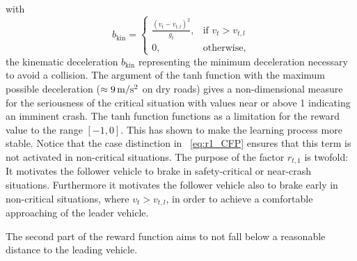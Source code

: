 \documentclass[review]{elsarticle}
\providecommand{\martinc}[1]{}                  %
\providecommand{\sub}[1]{_{\mathrm{#1}}}  %
\providecommand{\3}{{\ss}}
\begin{document}
	with
	\begin{equation}
	\label{bkin}
	b\sub{kin} = 
	\begin{cases}
	\frac{(v_t-v_{t,l})^2}{g_t},& \text{if } v_t>v_{t,l}\\
	0,              & \text{otherwise},
	\end{cases}
	\end{equation}
	the kinematic deceleration $b\sub{kin}$ representing the minimum deceleration necessary to avoid a collision.
	The argument of the tanh function with  the
	maximum possible deceleration ($\approx \unit[9]{m/s^2}$ on dry roads) gives a
	non-dimensional measure for the seriousness of the critical situation
	with values 
	near or above 1 indicating an imminent crash.  The tanh function functions as a limitation for the reward value to the range $[-1,0]$. This has shown to make the learning process more stable. Notice that the case distinction in ~\eqref{eq:r1_CFP}  ensures that
	this term is not activated in non-critical situations. The purpose of
	the factor $r_{t,1}$ is twofold: It motivates the follower vehicle to
	brake in safety-critical or near-crash situations.  Furthermore it
	motivates the follower vehicle also to brake early in non-critical
	situations, where $ v_t>v_{t,l}$, in order to achieve a comfortable
	approaching of the leader vehicle.\martinc{Nicht wirklich, weil diese
		Funktion nur in zumindest milde kritischen Situationen $b\sub{kin}>b\sub{comf}$ anspringt.}
	
	The second part of the reward function aims to not fall below a reasonable
	distance to the leading vehicle.
	
\end{document}
